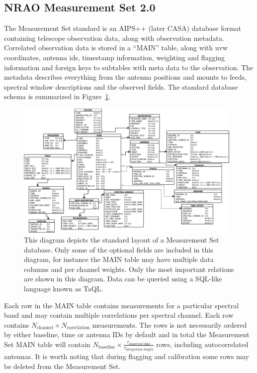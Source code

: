 \subsection{NRAO Measurement Set 2.0}
The Measurement Set standard \cite{ms10,ms20} is an AIPS++ (later CASA) database format containing telescope observation data, 
along with observation metadata. Correlated observation data is stored in a ``MAIN'' table, along with uvw coordinates, antenna ids, 
timestamp information, weighting and flagging information and foreign keys to subtables with meta data to the observation. The 
metadata describes everything from the antenna positions and mounts to feeds, spectral window descriptions and the observed fields. The
standard database schema is summarized in Figure~\ref{FIG_MS_RELATIONS}.
\begin{figure}[ht!]
 \begin{mdframed}
  \centering
  \includegraphics[width=0.975\textwidth]{images/ms_relations.png}
  \caption[Measurement Set schema]{This diagram depicts the standard layout of a Measurement Set database. Only some of the optional fields
  are included in this diagram, for instance the MAIN table may have multiple data columns and per channel weights. Only the most important
  relations are shown in this diagram. Data can be queried using a SQL-like language known as TaQL.}
  \label{FIG_MS_RELATIONS}
 \end{mdframed}
\end{figure}

Each row in the MAIN table contains measurements for a particular spectral band and may contain multiple correlations per spectral channel. Each
row contains $N_\text{channel}\times N_\text{correlation}$ measurements. The rows is not necessarily 
ordered by either baseline, time or antenna IDs by default and in total the Measurement Set MAIN table
will contain $N_\text{baseline}\times \frac{\tau_\text{observed time}}{\tau_\text{integration length}}$ rows, including autocorrelated antennas. It is worth noting 
that during flagging and calibration some rows may be deleted from the Measurement Set.

